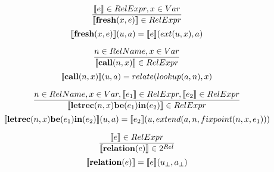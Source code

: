 \documentclass[11pt]{article}
\begin{document}
$$ \frac{\llbracket e\rrbracket \in RelExpr, x \in Var}{\llbracket\textrm{\textbf{fresh}}(x,e)\rrbracket \in RelExpr}$$
$$ \llbracket\textrm{\textbf{fresh}}(x,e)\rrbracket(u, a) = \llbracket e\rrbracket(ext(u,x), a) $$

$$ \frac{ n \in RelName, x \in Var }{ \llbracket\textrm{\textbf{call}}(n,x)\rrbracket \in RelExpr } $$
$$ \llbracket\textrm{\textbf{call}}(n,x)\rrbracket(u, a) = relate(lookup(a,n), x) $$

$$ \frac{ n \in RelName , x \in Var,\llbracket e_1\rrbracket \in RelExpr, \llbracket e_2\rrbracket \in RelExpr}{ \llbracket\textrm{\textbf{letrec}} (n, x) \textrm{\textbf{be}} (e_1) \textrm{\textbf{in}} (e_2)\rrbracket \in RelExpr } $$
$$ \llbracket\textrm{\textbf{letrec}} (n, x) \textrm{\textbf{be}} (e_1) \textrm{\textbf{in}} (e_2)\rrbracket (u, a) = \llbracket e_2\rrbracket(u, extend(a, n, fixpoint(n, x, e_1))) $$

$$ \frac{ \llbracket e\rrbracket \in RelExpr }{ \llbracket\textrm{\textbf{relation}} (e)\rrbracket \in 2^{Rel} } $$
$$ \llbracket\textrm{\textbf{relation}} (e)\rrbracket = \llbracket e\rrbracket(u_\bot, a_\bot) $$

\begin{center}

\end{center}
\end{document}
